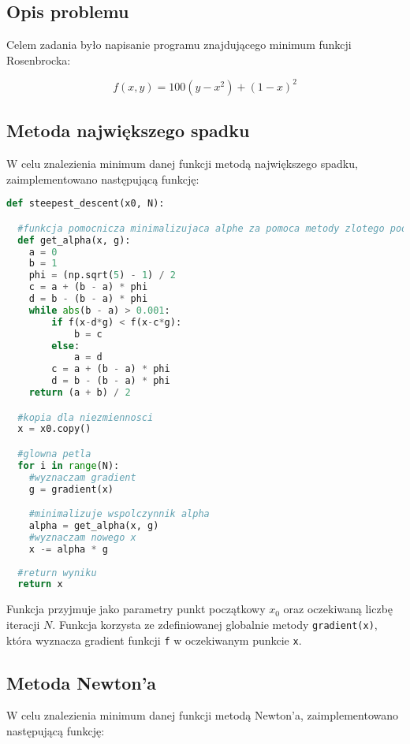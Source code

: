 \documentclass{article}
\begin{document}
	\subsection*{Opis problemu}

	Celem zadania było napisanie programu znajdującego minimum funkcji Rosenbrocka:

	\begin{equation}
		f(x,y) = 100(y-x^2)+(1-x)^2
	\end{equation}

	\subsection*{Metoda największego spadku}

	W celu znalezienia minimum danej funkcji metodą największego spadku, zaimplementowano następującą funkcję:

	\begin{lstlisting}[language=Python]
def steepest_descent(x0, N):

  #funkcja pomocnicza minimalizujaca alphe za pomoca metody zlotego podzialu
  def get_alpha(x, g):
    a = 0
    b = 1
    phi = (np.sqrt(5) - 1) / 2
    c = a + (b - a) * phi
    d = b - (b - a) * phi
    while abs(b - a) > 0.001:
        if f(x-d*g) < f(x-c*g):
            b = c
        else:
            a = d
        c = a + (b - a) * phi
        d = b - (b - a) * phi
    return (a + b) / 2

  #kopia dla niezmiennosci
  x = x0.copy()

  #glowna petla
  for i in range(N):
    #wyznaczam gradient
    g = gradient(x)

    #minimalizuje wspolczynnik alpha
    alpha = get_alpha(x, g)
    #wyznaczam nowego x
    x -= alpha * g
    
  #return wyniku
  return x
	\end{lstlisting}

	Funkcja przyjmuje jako parametry punkt początkowy $x_0$ oraz oczekiwaną liczbę iteracji $N$. Funkcja korzysta ze zdefiniowanej globalnie metody \texttt{gradient(x)}, która wyznacza gradient funkcji \texttt{f} w oczekiwanym punkcie \texttt{x}.


	\subsection*{Metoda Newton'a}

	W celu znalezienia minimum danej funkcji metodą Newton'a, zaimplementowano następującą funkcję:
\end{document}

